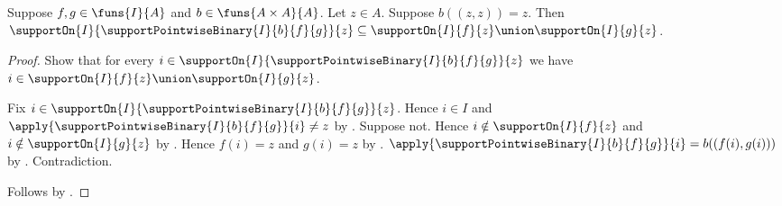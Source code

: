 \begin{theorem}\label{support_pointwise_binary_bound}
    Suppose $f,g\in\funs{I}{A}$ and $b\in\funs{A\times A}{A}$.
    Let $z\in A$.
    Suppose $b((z,z))=z$.
    Then
        $\supportOn{I}{\supportPointwiseBinary{I}{b}{f}{g}}{z}
        \subseteq\supportOn{I}{f}{z}\union\supportOn{I}{g}{z}$.
\end{theorem}
\begin{proof}
    Show that for every
        $i\in\supportOn{I}{\supportPointwiseBinary{I}{b}{f}{g}}{z}$
        we have $i\in
            \supportOn{I}{f}{z}\union\supportOn{I}{g}{z}$.
    \begin{subproof}
        Fix $i\in
            \supportOn{I}{\supportPointwiseBinary{I}{b}{f}{g}}{z}$.
        Hence $i\in I$ and
            $\apply{\supportPointwiseBinary{I}{b}{f}{g}}{i}\neq z$ by
            .
        Suppose not.
        Hence $i\notin\supportOn{I}{f}{z}$ and
            $i\notin\supportOn{I}{g}{z}$ by .
        Hence $f(i)=z$ and $g(i)=z$ by
            .
        $\apply{\supportPointwiseBinary{I}{b}{f}{g}}{i}
            =b((f(i),g(i)))$ by
            .
        Contradiction.
    \end{subproof}
    Follows by .
\end{proof}
